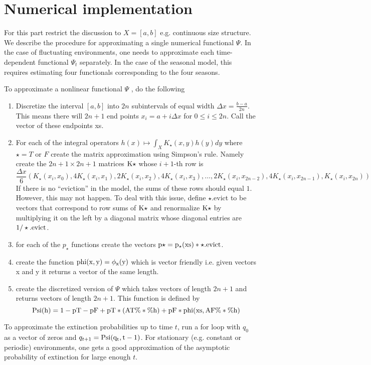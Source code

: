 \documentclass{amsart}
\def\o{\%*\%}
\begin{document}
\section*{Numerical implementation}
For this part restrict the discussion to $X=[a,b]$ e.g. continuous size structure. We describe the procedure for approximating a single numerical functional $\Psi$. In the case of fluctuating environments, one needs to approximate each time-dependent functional $\Psi_t$ separately. In the case of the seasonal model, this requires estimating four functionals corresponding to the four seasons. 

To approximate a nonlinear functional $\Psi$ , do the following
\begin{enumerate}
\item Discretize the interval $[a,b]$ into $2n$ subintervals of equal width $\Delta x = \frac{b-a}{2n}$. This means there will $2n+1$ end points $x_i = a+i \Delta x$ for $0\le i \le 2n$. Call the vector of these endpoints xs.
\item For each of the integral operators $h(x)\mapsto \int_X K_\star(x,y) h(y)dy$ where $\star = T$ or $F$ create the matrix approximation using Simpson's rule. Namely create the $2n+1 \times 2n+1$ matrices $\rm{K\star}$ whose $i+1$-th row is 
\[
\frac{\Delta x}{6}
(K_\star(x_i,x_0),4K_\star(x_i,x_1),2K_\star(x_i,x_2),4K_\star(x_i,x_3),\dots, 2K_\star(x_i,x_{2n-2}),4K_\star(x_i,x_{2n-1}),K_\star(x_i,x_{2n}))
\]
If there is no ``eviction'' in the model, the sums of these rows should equal $1$. However, this may not happen. To deal with this issue, define $\star$.evict to be vectors that correspond to row sums of $\rm{K}\star$ and renormalize $\rm{K}\star$ by multiplying it on the left by a diagonal matrix whose diagonal entries are $1/\star.\rm{evict}$. 
\item for each of the $p_\star$ functions create the vectors $\rm{p\star}=p_\star(xs)*\star\rm{.evict}$.
\item create the function $\rm{phi}(x,y)=\phi_x(y)$ which is vector friendly i.e. given vectors x and y it returns a vector of the same length. 
\item create the discretized version of $\Psi$ which takes vectors of length $2n+1$ and returns vectors of length $2n+1$. This function is defined by 
\[
\rm{Psi}(h) = 1 - \rm{pT}-\rm{pF}+\rm{pT}*(AT\o h)+\rm{pF}*\rm{phi}(\rm{xs},AF\o h)
\]
\end{enumerate}

To approximate the extinction probabilities up to time $t$, run a for loop with $q_0$ as a vector of zeros and $q_{t+1}=\rm{Psi}(q_t,t-1)$. For stationary (e.g. constant or periodic) environments, one gets a good approximation of the asymptotic probability of extinction for large enough $t$. 
\end{document}
